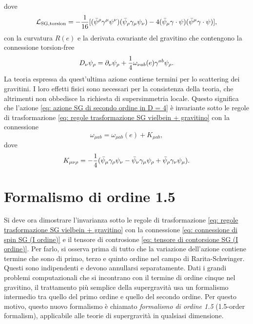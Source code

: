 dove 
\begin{equation}
    \mathcal{L}_{\mathrm{SG},\mathrm{torsion}} = -\frac{1}{16}[(\bar{\psi}^\rho\gamma^\mu\psi^\nu)(\bar{\psi}_\rho\gamma_\mu\psi_\nu) - 4(\bar{\psi}_\mu\gamma \cdot \psi)(\bar{\psi}^\mu\gamma \cdot \psi)],
\end{equation}
con la curvatura $R(e)$ e la derivata covariante del gravitino che contengono la connessione torsion-free 
\begin{equation}
    D_\nu\psi_\rho = \partial_\nu\psi_\rho + \frac{1}{4}\omega_{\nu ab}(e)\gamma^{ab}\psi_\rho.
\end{equation}
La teoria espressa da quest'ultima azione contiene termini per lo scattering dei gravitini. I loro effetti fisici sono necessari per la consistenza della teoria, che altrimenti non obbedisce la richiesta di supersimmetria locale. Questo significa che l'azione \eqref{eq: azione SG di secondo ordine in D = 4} è invariante sotto le regole di trasformazione \eqref{eq: regole trasformazione SG vielbein + gravitino} con la connessione
\begin{equation}
\label{eq: connessione di spin SG (I ordine)}
    \omega_{\mu ab} = \omega_{\mu ab}(e) + K_{\mu ab},
\end{equation}
dove 
\begin{equation}
\label{eq: tensore di contorsione SG (I ordine)}
    K_{\mu\nu\rho} = -\frac{1}{4}(\bar{\psi}_\mu\gamma_\rho\psi_\nu - \bar{\psi}_\nu\gamma_\mu\psi_\rho + \bar{\psi}_\rho\gamma_\nu\psi_\mu).
\end{equation}

\section{Formalismo di ordine 1.5}
Si deve ora dimostrare l'invarianza sotto le regole di trasformazione \eqref{eq: regole trasformazione SG vielbein + gravitino} con la connessione \eqref{eq: connessione di spin SG (I ordine)} e il tensore di controsione \eqref{eq: tensore di contorsione SG (I ordine)}. Per farlo, si osserva prima di tutto che la variazione dell'azione contiene termine che sono di primo, terzo e quinto ordine nel campo di Rarita-Schwinger. Questi sono indipendenti e devono annullarsi separatamente. Dati i grandi problemi computazionali che si incontrano con il termine di ordine cinque nel gravitino, il trattamento più semplice della supergravità usa un formalismo intermedio tra quello del primo ordine e quello del secondo ordine. Per questo motivo, questo nuovo formalismo è chiamato \emph{formalismo di ordine 1.5} (1.5-order formalism), applicabile alle teorie di supergravità in qualsiasi dimensione. 

